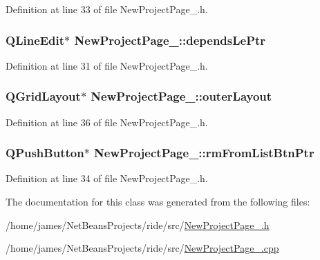 Definition at line 33 of file New\-Project\-Page\-\_.\-h.

\hypertarget{class_new_project_page__4_a2e6e4ec9aadc2398498d542243b5f9a9}{
\subsubsection[{depends\-Le\-Ptr}]{\setlength{\rightskip}{0pt plus 5cm}Q\-Line\-Edit$\ast$ New\-Project\-Page\-\_\-::depends\-Le\-Ptr\hspace{0.3cm}{\ttfamily [private]}}}\label{class_new_project_page__4_a2e6e4ec9aadc2398498d542243b5f9a9}


Definition at line 31 of file New\-Project\-Page\-\_.\-h.

\hypertarget{class_new_project_page__4_a3e2ba713d9f039382de43a5b362ff3b8}{
\subsubsection[{outer\-Layout}]{\setlength{\rightskip}{0pt plus 5cm}Q\-Grid\-Layout$\ast$ New\-Project\-Page\-\_\-::outer\-Layout\hspace{0.3cm}{\ttfamily [private]}}}\label{class_new_project_page__4_a3e2ba713d9f039382de43a5b362ff3b8}


Definition at line 36 of file New\-Project\-Page\-\_.\-h.

\hypertarget{class_new_project_page__4_adc7e800ceb08846ee3154e309f19542a}{
\subsubsection[{rm\-From\-List\-Btn\-Ptr}]{\setlength{\rightskip}{0pt plus 5cm}Q\-Push\-Button$\ast$ New\-Project\-Page\-\_\-::rm\-From\-List\-Btn\-Ptr\hspace{0.3cm}{\ttfamily [private]}}}\label{class_new_project_page__4_adc7e800ceb08846ee3154e309f19542a}


Definition at line 34 of file New\-Project\-Page\-\_.\-h.



The documentation for this class was generated from the following files\-:\begin{DoxyCompactItemize}
\item 
/home/james/\-Net\-Beans\-Projects/ride/src/\hyperlink{_new_project_page__4_8h}{New\-Project\-Page\-\_.\-h}\item 
/home/james/\-Net\-Beans\-Projects/ride/src/\hyperlink{_new_project_page__4_8cpp}{New\-Project\-Page\-\_.\-cpp}\end{DoxyCompactItemize}
